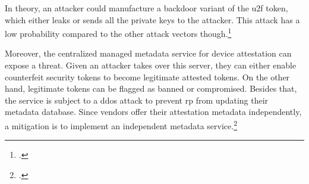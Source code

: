 In theory, an attacker could manufacture a backdoor variant of the \gls{u2f} token, which either leaks or sends all the private keys to the attacker. This attack has a low probability compared to the other attack vectors though.\footcites[See][3]{DBLP:journals/corr/abs-1810-04660}

Moreover, the centralized managed metadata service for device attestation can expose a threat. Given an attacker takes over this server, they can either enable counterfeit security tokens to become legitimate attested tokens. On the other hand, legitimate tokens can be flagged as banned or compromised. Besides that, the service is subject to a \gls{ddos} attack to prevent \gls{rp} from updating their metadata database. Since vendors offer their attestation metadata independently, a mitigation is to implement an independent metadata service.\footcites[See][]{fido-metadata}[See][17]{Chang2017OnMU}
